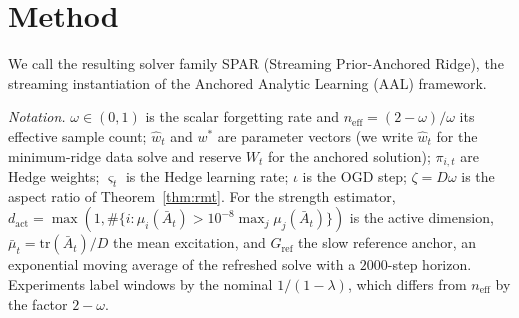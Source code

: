 \documentclass[twoside,11pt]{article}
\begin{document}
\begin{table}[t]
\centering
\footnotesize
\setlength{\tabcolsep}{4pt}
\caption{What is new relative to the nearest lines of work. ``DE'' is the finite-window deterministic-equivalent correction; ``Lean'' the machine-checked core.}
\label{tab:related}
\end{table}

\section{Method}
We call the resulting solver family SPAR (Streaming Prior-Anchored Ridge), the streaming instantiation of the Anchored Analytic Learning (AAL) framework.

\emph{Notation.}
$\omega \in (0,1)$ is the scalar forgetting rate and $n_{\mathrm{eff}} = (2-\omega)/\omega$ its effective sample count; $\widehat w_t$ and $w^*$ are parameter vectors (we write $\widehat w_t$ for the minimum-ridge data solve and reserve $W_t$ for the anchored solution); $\pi_{i,t}$ are Hedge weights; $\varsigma_t$ is the Hedge learning rate; $\iota$ is the OGD step; $\zeta = D\omega$ is the aspect ratio of Theorem~\ref{thm:rmt}. For the strength estimator, $d_{\mathrm{act}} = \max(1,\#\{i:\mu_i(\bar A_t) > 10^{-8}\max_j\mu_j(\bar A_t)\})$ is the active dimension, $\bar\mu_t = \mathrm{tr}(\bar A_t)/D$ the mean excitation, and $G_{\mathrm{ref}}$ the slow reference anchor, an exponential moving average of the refreshed solve with a $2000$-step horizon. Experiments label windows by the nominal $1/(1-\lambda)$, which differs from $n_{\mathrm{eff}}$ by the factor $2-\omega$.
\end{document}
